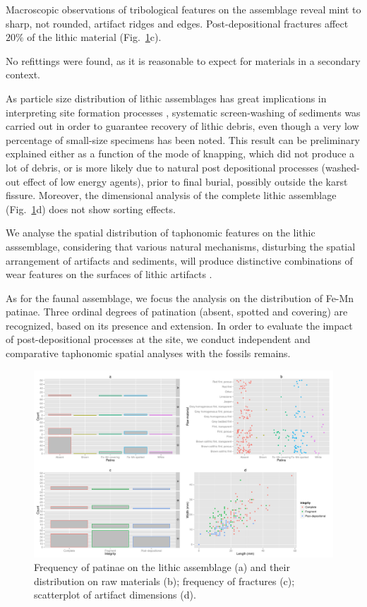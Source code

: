 \documentclass[review,authoryear]{elsarticle} %
\begin{document}
Macroscopic observations of tribological features on the assemblage reveal mint to sharp, not rounded, artifact ridges and edges. Post-depositional fractures affect $20\%$ of the lithic material (Fig.~\ref{fig:2}c).

No refittings were found, as it is reasonable to expect for materials in a secondary context.

As particle size distribution of lithic assemblages has great implications in interpreting site formation processes \citep{Bertran2012}, systematic screen-washing of sediments was carried out in order to guarantee recovery of lithic debris, even though a very low percentage of small-size specimens has been noted. This result can be preliminary explained either as a function of the mode of knapping, which did not produce a lot of debris, or is more likely due to natural post depositional processes (washed-out effect of low energy agents), prior to final burial, possibly outside the karst fissure. Moreover, the dimensional analysis of the complete lithic assemblage (Fig.~\ref{fig:2}d) does not show sorting effects.

We analyse the spatial distribution of taphonomic features on the lithic asssemblage, considering that various natural mechanisms, disturbing the spatial arrangement of artifacts and sediments, will produce distinctive combinations of wear features on the surfaces of lithic artifacts \citep{Burroni2002}.

As for the faunal assemblage, we focus the analysis on the distribution of Fe-Mn patinae. Three ordinal degrees of patination (absent, spotted and covering) are recognized, based on its presence and extension. In order to evaluate the impact of post-depositional processes at the site, we conduct independent and comparative taphonomic spatial analyses with the fossils remains.

\begin{figure}
  \centering
  \includegraphics[width=1\textwidth]{../artwork/Fig2.pdf}
  \caption{Frequency of patinae on the lithic assemblage (a) and their distribution on raw materials (b); frequency of fractures (c); scatterplot of artifact dimensions (d).}
  \label{fig:2}
\end{figure}
\end{document}
